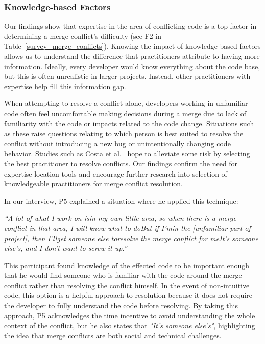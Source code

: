 \subsubsection{\underline{Knowledge-based Factors}}
Our findings show that expertise in the area of conflicting code is a top factor in determining a merge conflict's difficulty (see F2 in Table~\ref{survey_merge_conflicts}).
Knowing the impact of knowledge-based factors allows us to understand the difference that practitioners attribute to having more information. Ideally, every developer would know everything about the code base, but this is often unrealistic in larger projects. Instead, other practitioners with expertise help fill this information gap.

When attempting to resolve a conflict alone, developers working in unfamiliar code often feel uncomfortable making decisions during a merge due to lack of familiarity with the code or impacts related to the code change\cite{CostaSarma}. 
Situations such as these raise questions relating to which person is best suited to resolve the conflict without introducing a new bug or unintentionally changing code behavior. Studies such as Costa et al.~\cite{CostaSarma} hope to alleviate some risk by selecting the best practitioner to resolve conflicts. Our findings confirm the need for expertise-location tools and encourage further research into selection of knowledgeable practitioners for merge conflict resolution.

In our interview, P5 explained a situation where he applied this technique: 

\begin{displayquote}
	\textit{``A lot of what I work on is\textellipsis in my own little area, so when there is a merge conflict in that area, I will know what to do\textellipsis But if I'm\textellipsis in the [unfamiliar part of project], then I'll\textellipsis get someone else to\textellipsis resolve the merge conflict for me\textellipsis It's someone else's, and I don't want to screw it up.''}
\end{displayquote}

This participant found knowledge of the effected code to be important enough that he would find someone who is familiar with the code around the merge conflict rather than resolving the conflict himself. In the event of non-intuitive code, this option is a helpful approach to resolution because it does not require the developer to fully understand the code before resolving. By taking this approach, P5 acknowledges the time incentive to avoid understanding the whole context of the conflict, but he also states that \textit{"It's someone else's"}, highlighting the idea that merge conflicts are both social and technical challenges.

